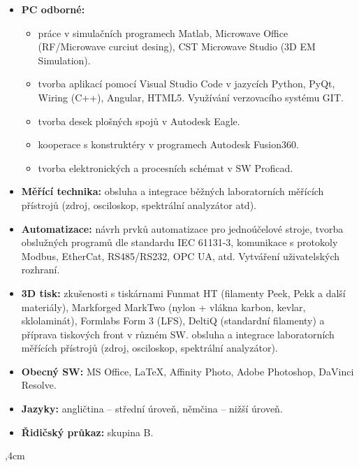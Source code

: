 \documentclass[10pt]{article}
\begin{document}
\begin{itemize}
    \item \textbf{PC odborné:} 
    \begin{itemize}
        \item práce v simulačních programech Matlab, Microwave Office (RF/Microwave curciut desing), CST Microwave Studio (3D EM Simulation).
        \item tvorba aplikací pomocí Visual Studio Code v jazycích Python, PyQt, Wiring (C++), Angular, HTML5. Využívání verzovacího systému GIT.
        \item tvorba desek plošných spojů v Autodesk Eagle.
        \item kooperace s konstruktéry v programech Autodesk Fusion360.
        \item tvorba elektronických a procesních schémat v SW Proficad.
    \end{itemize}
    \item \textbf{Měřící technika:} obsluha a integrace běžných laboratorních měřících přístrojů (zdroj, osciloskop, spektrální analyzátor atd).
    \item \textbf{Automatizace:} návrh prvků automatizace pro jednoúčelové stroje, tvorba obslužných programů dle standardu IEC 61131-3, 
    komunikace s protokoly Modbus, EtherCat, RS485/RS232, OPC UA, atd. Vytváření uživatelských rozhraní.
    \item \textbf{3D tisk:} zkušenosti s tiskárnami Funmat HT (filamenty Peek, Pekk a další materiály), Markforged MarkTwo (nylon + vlákna karbon, kevlar, sklolaminát), Formlabs Form 3 (LFS), DeltiQ (standardní filamenty) a příprava tiskových front v různém SW. 
    obsluha a integrace laboratorních měřících přístrojů (zdroj, osciloskop, spektrální analyzátor).
    \item \textbf{Obecný SW:} MS Office, \uv\LaTeX, Affinity Photo, Adobe Photoshop, DaVinci Resolve.
    \item \textbf{Jazyky:} angličtina – střední úroveň, němčina – nižší úroveň.
    \item \textbf{Řidičský průkaz:} skupina B.
\end{itemize}

\noindent\hrulefill
{},4cm
\end{document}
